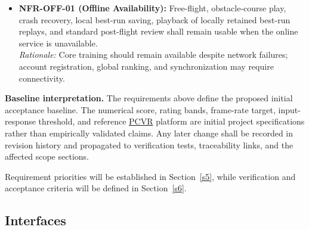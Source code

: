 \documentclass[12pt]{article}
\begin{document}
\begin{itemize}
\textit{Rationale:} Persistence across sessions is the defining acceptance condition for cloud-backed storage.
\item \hypertarget{req:NFR-OFF-01}{}\textbf{NFR-OFF-01 (Offline Availability):} Free-flight, obstacle-course play, crash recovery, local best-run saving, playback of locally retained best-run replays, and standard post-flight review shall remain usable when the online service is unavailable.\\
\textit{Rationale:} Core training should remain available despite network failures; account registration, global ranking, and synchronization may require connectivity.
\end{itemize}

\noindent\textbf{Baseline interpretation.}
The requirements above define the proposed initial acceptance baseline. The numerical score, 
rating bands, frame-rate target, input-response threshold, and reference \hyperlink{glos:PCVR}{PCVR} platform are initial project specifications rather than empirically validated claims. Any later change 
shall be recorded in revision history and propagated to verification tests, traceability links, and the affected scope sections.

Requirement priorities will be established in
Section~\ref{s5}, while verification and
acceptance criteria will be defined in
Section~\ref{s6}.







\subsection{Interfaces}\label{s3}
\end{document}
